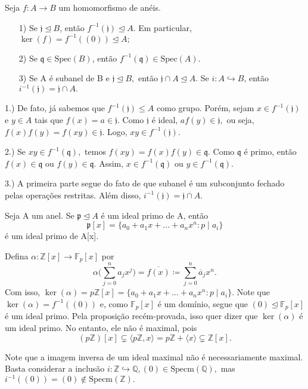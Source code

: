 \documentclass[algebraII_notes.tex]{subfiles}
\begin{document}
\begin{prop*}
	Seja \(f:A\rightarrow B\) um homomorfismo de anéis.
	\begin{itemize}
		\item[1)] Se \(\mathfrak{j}\trianglelefteq{B}\), então \(f^{-1}(\mathfrak{j})\trianglelefteq{A}.\) Em particular, \(\ker{(f)} = f^{-1}((0))\trianglelefteq{A};\)
		\item[2)] Se \(\mathfrak{q}\in \mathrm{Spec}(B)\), então \(f^{-1}(\mathfrak{q})\in \mathrm{Spec}(A).\)
		\item[3)] Se A é subanel de B e \(\mathfrak{j}\trianglelefteq{B},\) então \(\mathfrak{j}\cap A \trianglelefteq{A}.\) Se \(i:A\hookrightarrow B\),
		      então \(i^{-1}(\mathfrak{j})=\mathfrak{j}\cap A.\)
	\end{itemize}
	\begin{proof*}
		1.) De fato, já sabemos que \(f^{-1}(\mathfrak{j})\leq A\) como grupo. Porém, sejam \(x\in f^{-1}(\mathfrak{j})\)
		e \(y\in A\) tais que \(f(x) = a\in \mathfrak{j}.\) Como \(\mathfrak{j}\) é ideal, \(af(y)\in \mathfrak{j},\)
		ou seja, \(f(x)f(y) = f(xy)\in \mathfrak{j}\). Logo, \(xy\in f^{-1}(\mathfrak{j})\).

		2.) Se \(xy\in f^{-1}(\mathfrak{q}),\) temos \(f(xy) = f(x)f(y)\in \mathfrak{q}.\) Como \(\mathfrak{q}\) é primo,
		então \(f(x)\in \mathfrak{q}\) ou \(f(y)\in \mathfrak{q}.\) Assim, \(x\in f^{-1}(\mathfrak{q})\) ou \(y\in f^{-1}(\mathfrak{q}).\)

		3.) A primeira parte segue do fato de que subanel é um subconjunto fechado pelas operações restritas. Além disso,
		\(i^{-1}(\mathfrak{j}) = \mathfrak{j}\cap A.\) \qedsymbol
	\end{proof*}
\end{prop*}
\begin{example}[Exercício]
	Seja A um anel. Se \(\mathfrak{p}\trianglelefteq A\) é um ideal primo de A, então
	\[
		\mathfrak{p}[x] = \{a_{0} + a_{1}x + \dotsc + a_{n}x^{n}:p\mid a_{i}\}
	\]
	é um ideal primo de A[x].
\end{example}
\begin{example}
	Defina \(\alpha :\mathbb{Z}[x]\rightarrow \mathbb{F}_{p}[x]\) por
	\[
		\alpha \biggl(\sum\limits_{j=0}^{n}a_{j}x^{j}\biggr) = \overline{f(x)}\coloneqq \sum\limits_{j=0}^{n}\overline{a}_{j}x^{n}.
	\]
	Com isso, \(\ker{(\alpha )} = p \mathbb{Z}[x] = \{a_{0} + a_1x + \dotsc +a_{n}x^{n}: p\mid a_{i}\}\). Note que
	\(\ker{(\alpha )} = f^{-1}((0))\) e, como \(\mathbb{F}_{p}[x]\) é um domínio, segue que \((0)\trianglelefteq \mathbb{F}_{p}[x]\) é um ideal primo.
	Pela proposição recém-provada, isso quer dizer que \(\ker{(\alpha )}\) é um ideal primo. No entanto, ele não é maximal, pois
	\[
		(p \mathbb{Z})[x] \subsetneq \langle p \mathbb{Z}, x \rangle = p \mathbb{Z} + \langle x \rangle \subsetneq \mathbb{Z}[x].
	\]
\end{example}
Note que a imagem inversa de um ideal maximal não é necessariamente maximal.
Basta considerar a inclusão \(i:\mathbb{Z}\hookrightarrow \mathbb{Q}, (0)\in \mathrm{Specm}(\mathbb{Q}),\)
mas \(i^{-1}((0)) = (0)\not\in \mathrm{Specm}(\mathbb{Z}).\)
\end{document}
